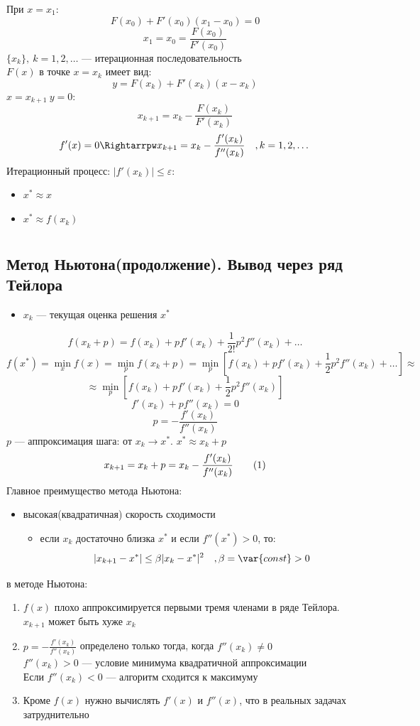 \documentclass[oneside]{book}
\newcommand\addtag{\refstepcounter{equation}\tag{\theequation}}
\newcommand{\const}{\var{const}}
\theoremstyle{plain}
\theoremstyle{remark}
\theoremstyle{definition}
\begin{document}
При \(x = x_1\):
\[ F(x_0) + F'(x_0)(x_1 - x_0) = 0 \]
\[ x_1 = x_0 = \frac{F(x_0)}{F'(x_0)} \]
\(\{x_k\},\ k = 1, 2, \dots\) --- итерационная последовательность \\
\(F(x)\) в точке \(x = x_k\) имеет вид:
\[ y = F(x_k) + F'(x_k)(x - x_k) \]
\(x = x_{k + 1}\ y = 0\):
\[ x_{k+1} = x_k - \frac{F(x_k)}{F'(x_k)} \]
\[ f'(x) = 0 \Rightarrpw x_{k + 1} = x_k - \frac{f'(x_k)}{f''(x_k)}\quad,k=1,2,\dots \]
Итерационный процесс: \(|f'(x_k)| \le \varepsilon\):
\begin{itemize}
\item \(x^* \approx x\)
\item \(x^* \approx f(x_k)\)
\end{itemize}
\chapter{}
\label{sec:org0377ffd}
\section{Метод Ньютона(продолжение). Вывод через ряд Тейлора}
\label{sec:org1c0be76}
\begin{itemize}
\item \(x_k\) --- текущая оценка решения \(x^*\)
\end{itemize}
\[ f(x_k + p) = f(x_k) + pf'(x_k) + \frac{1}{2!}p^2f''(x_k) + \dots \]
\[ f(x^*) = \min_x f(x) = \min_p f(x_k + p) = \min_p [ f(x_k) + pf'(x_k) + \frac{1}{2}p^2 f''(x_k)  + \dots ] \approx \]
\[ \approx \min_p[f(x_k) + pf'(x_k) + \frac{1}{2}p^2 f''(x_k)] \]
\[ f'(x_k) + pf''(x_k) = 0 \]
\[ p = -\frac{f'(x_k)}{f''(x_k)} \]
\(p\) --- аппроксимация шага: от \(x_k \to x^*\). \(x^* \approx x_k + p\)
\[ x_{k + 1} = x_k + p = x_k - \frac{f'(x_k)}{f''(x_k)} \label{nuton_1_5}\addtag \]
Главное преимущество метода Ньютона:
\begin{itemize}
\item высокая(квадратичная) скорость сходимости
\begin{itemize}
\item если \(x_k\) достаточно близка \(x^*\) и если \(f''(x^*) > 0\), то:
\[ |x_{k+1} - x^*| \le \beta|x_k - x^*|^2\quad, \beta = \const > 0 \]
\end{itemize}
\end{itemize}

 в методе Ньютона:
\begin{enumerate}
\item \(f(x)\) плохо аппроксимируется первыми тремя членами в ряде Тейлора. \(x_{k+1}\) может быть хуже \(x_k\)
\item \(p=-\frac{f'(x_k)}{f''(x_k)}\) определено только тогда, когда \(f''(x_k)\neq0\) \\
\(f''(x_k) > 0\) --- условие минимума квадратичной аппроксимации \\
Если \(f''(x_k) < 0\) --- алгоритм сходится к максимуму
\item Кроме \(f(x)\) нужно вычислять \(f'(x)\) и \(f''(x)\), что в реальных задачах затруднительно
\end{enumerate}
\end{document}
